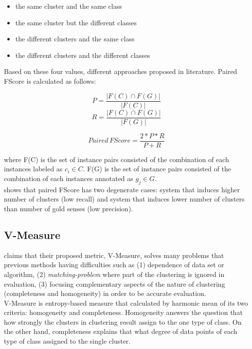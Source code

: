 \begin{itemize}
\item the same cluster and the same class
\item the same cluster but the different classes
\item the different clusters and the same class
\item the different clusters and the different classes
\end{itemize}

Based on these four values, different approaches proposed in literature. Paired FScore is calculated as follows:

\begin{equation}
P = \dfrac{|F(C) \cap F(G)|}{|F(C)|}
\end{equation}
\begin{equation}
R = \dfrac{|F(C) \cap F(G)|}{|F(G)|}
\end{equation}

\begin{equation}
Paired \, FScore = \dfrac{2 * P * R}{P + R}
\end{equation}

where F(C) is the set of instance pairs consisted of the combination of each instances labeled as $c_i \in C$. F(G) is the set of instance pairs consisted of the combination of each instances annotated as $g_j \in G$. \\

\cite{apidianaki2011quantitative} shows that paired FScore has two degenerate cases: system that induces higher number of clusters (low recall) and system that induces lower number of clusters than number of gold senses (low precision).



\subsection{V-Measure}

\cite{rosenberg07vmeasure} claims that their proposed metric, V-Measure, solves many problems that previous methods having difficulties such as (1) dependence of data set or algorithm, (2) \emph{matching-problem} where part of the clustering is ignored in evaluation, (3) focusing complementary aspects of the nature of clustering (completeness and homogeneity) in order to be accurate evaluation. \\

V-Measure is entropy-based measure that calculated by harmonic mean of its two criteria: homogeneity and completeness. Homogeneity answers the question that how strongly the clusters in clustering result assign to the one type of class. On the other hand, completeness explains that what degree of data points of each type of class assigned to the single cluster. 

